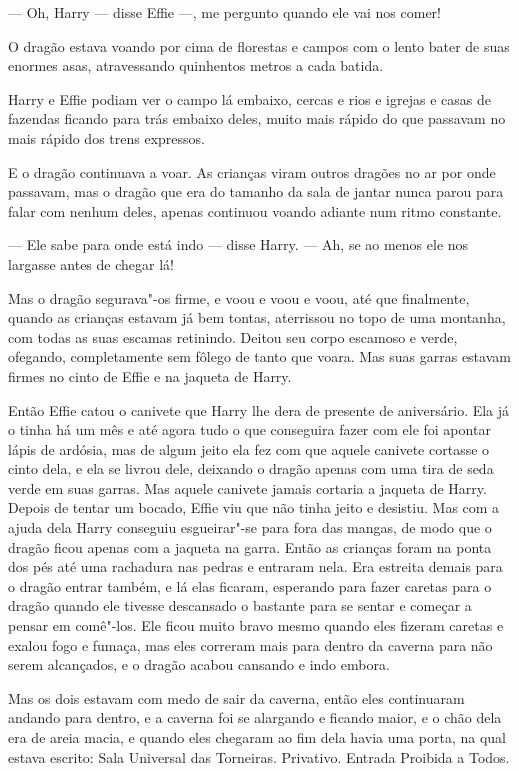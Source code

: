--- Oh, Harry --- disse Effie ---, me pergunto quando ele vai nos comer!

O dragão estava voando por cima de florestas e campos com o lento
bater de suas enormes asas, atravessando quinhentos metros a cada
batida.

Harry e Effie podiam ver o campo lá embaixo, cercas e rios e igrejas e
casas de fazendas ficando para trás embaixo deles, muito mais rápido
do que passavam no mais rápido dos trens expressos.

E o dragão continuava a voar. As crianças viram outros dragões no ar
por onde passavam, mas o dragão que era do tamanho da sala de jantar
nunca parou para falar com nenhum deles, apenas continuou voando
adiante num ritmo constante.

--- Ele sabe para onde está indo --- disse Harry. --- Ah, se ao menos ele nos
largasse antes de chegar lá!

Mas o dragão segurava"-os firme, e voou e voou e voou, até que
finalmente, quando as crianças estavam já bem tontas, aterrissou no
topo de uma montanha, com todas as suas escamas retinindo. 
Deitou seu corpo escamoso e verde, ofegando, completamente sem fôlego
de tanto que voara. Mas suas garras estavam firmes no cinto de Effie
e na jaqueta de Harry.

Então Effie catou o canivete que Harry lhe dera de presente de
aniversário. Ela já o tinha há um mês e até
agora tudo o que conseguira fazer com ele foi apontar lápis de
ardósia, mas de algum jeito ela fez com que aquele canivete cortasse
o cinto dela, e ela se livrou dele, deixando o dragão apenas com uma
tira de seda verde em suas garras. Mas aquele canivete jamais
cortaria a jaqueta de Harry. Depois de tentar um bocado, Effie viu que
não tinha jeito e desistiu. Mas com a ajuda dela Harry conseguiu
esgueirar"-se para fora das mangas, de modo que o dragão ficou apenas
com a jaqueta na garra. Então as crianças foram
na ponta dos pés até uma rachadura nas pedras e entraram nela. Era
estreita demais para o dragão entrar também, e lá elas ficaram,
esperando para fazer caretas para o dragão quando ele tivesse
descansado o bastante para se sentar e começar a pensar em comê"-los.
Ele ficou muito bravo mesmo quando eles fizeram caretas e
exalou fogo e fumaça, mas eles correram mais para dentro da caverna
para não serem alcançados, e o dragão acabou cansando e indo embora.

Mas os dois estavam com medo de sair da caverna, então eles
continuaram andando para dentro, e a caverna foi se alargando e
ficando maior, e o chão dela era de areia macia, e quando eles
chegaram ao fim dela havia uma porta, na qual estava escrito: Sala
Universal das Torneiras. Privativo. Entrada Proibida a Todos.

